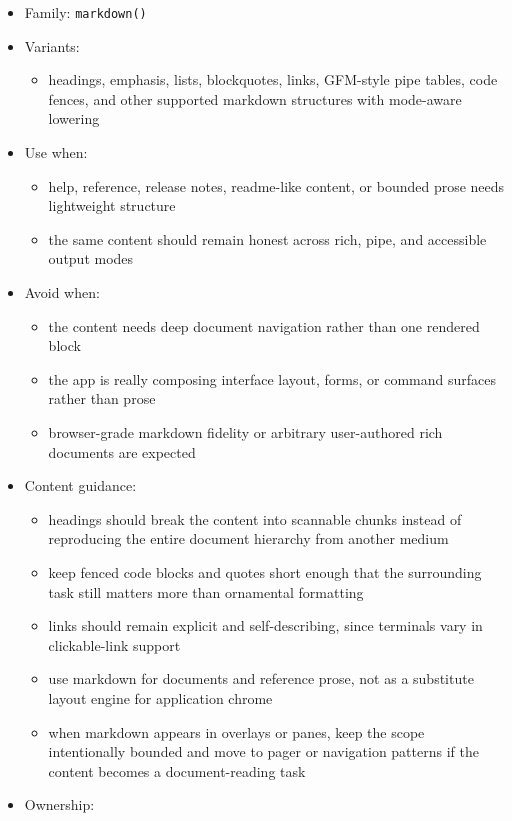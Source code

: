 \begin{itemize}
\tightlist
\item
  Family: \texttt{m\allowbreak{}a\allowbreak{}r\allowbreak{}k\allowbreak{}d\allowbreak{}o\allowbreak{}w\allowbreak{}n\allowbreak{}(\allowbreak{})}
\item
  Variants:

  \begin{itemize}
  \tightlist
  \item
    headings, emphasis, lists, blockquotes, links, GFM-style pipe tables, code fences, and other supported markdown structures with mode-aware lowering
  \end{itemize}
\item
  Use when:

  \begin{itemize}
  \tightlist
  \item
    help, reference, release notes, readme-like content, or bounded prose needs lightweight structure
  \item
    the same content should remain honest across rich, pipe, and accessible output modes
  \end{itemize}
\item
  Avoid when:

  \begin{itemize}
  \tightlist
  \item
    the content needs deep document navigation rather than one rendered block
  \item
    the app is really composing interface layout, forms, or command surfaces rather than prose
  \item
    browser-grade markdown fidelity or arbitrary user-authored rich documents are expected
  \end{itemize}
\item
  Content guidance:

  \begin{itemize}
  \tightlist
  \item
    headings should break the content into scannable chunks instead of reproducing the entire document hierarchy from another medium
  \item
    keep fenced code blocks and quotes short enough that the surrounding task still matters more than ornamental formatting
  \item
    links should remain explicit and self-describing, since terminals vary in clickable-link support
  \item
    use markdown for documents and reference prose, not as a substitute layout engine for application chrome
  \item
    when markdown appears in overlays or panes, keep the scope intentionally bounded and move to pager or navigation patterns if the content becomes a document-reading task
  \end{itemize}
\item
  Ownership:


\end{itemize}
